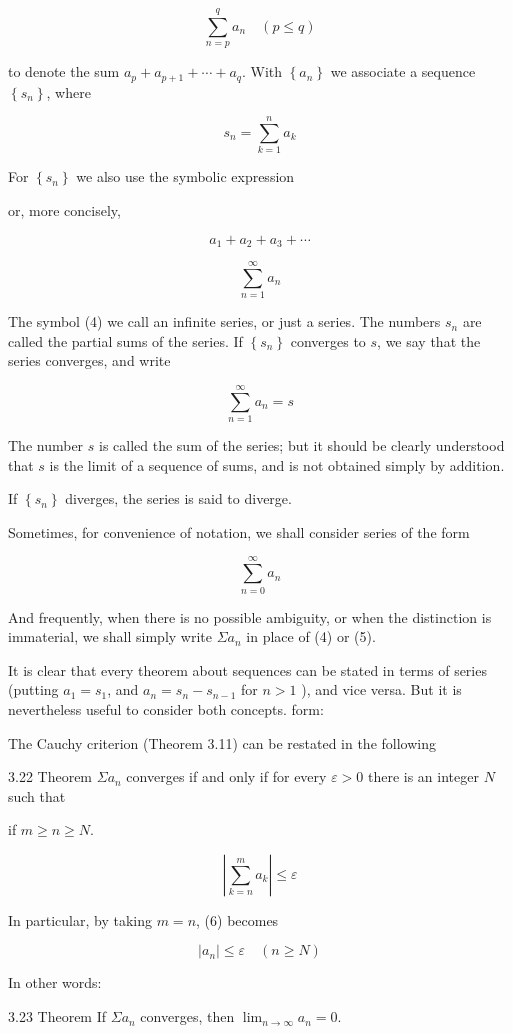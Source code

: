 \documentclass[10pt]{article}
\begin{document}
$$
\sum_{n=p}^{q} a_{n} \quad(p \leq q)
$$

to denote the sum $a_{p}+a_{p+1}+\cdots+a_{q}$. With $\left\{a_{n}\right\}$ we associate a sequence $\left\{s_{n}\right\}$, where

$$
s_{n}=\sum_{k=1}^{n} a_{k}
$$

For $\left\{s_{n}\right\}$ we also use the symbolic expression

or, more concisely,

$$
a_{1}+a_{2}+a_{3}+\cdots
$$

$$
\sum_{n=1}^{\infty} a_{n}
$$

The symbol (4) we call an infinite series, or just a series. The numbers $s_{n}$ are called the partial sums of the series. If $\left\{s_{n}\right\}$ converges to $s$, we say that the series converges, and write

$$
\sum_{n=1}^{\infty} a_{n}=s
$$

The number $s$ is called the sum of the series; but it should be clearly understood that $s$ is the limit of a sequence of sums, and is not obtained simply by addition.

If $\left\{s_{n}\right\}$ diverges, the series is said to diverge.

Sometimes, for convenience of notation, we shall consider series of the form

$$
\sum_{n=0}^{\infty} a_{n}
$$

And frequently, when there is no possible ambiguity, or when the distinction is immaterial, we shall simply write $\Sigma a_{n}$ in place of (4) or (5).

It is clear that every theorem about sequences can be stated in terms of series (putting $a_{1}=s_{1}$, and $a_{n}=s_{n}-s_{n-1}$ for $n>1$ ), and vice versa. But it is nevertheless useful to consider both concepts. form:

The Cauchy criterion (Theorem 3.11) can be restated in the following

3.22 Theorem $\Sigma a_{n}$ converges if and only if for every $\varepsilon>0$ there is an integer $N$ such that

if $m \geq n \geq N$.

$$
\left|\sum_{k=n}^{m} a_{k}\right| \leq \varepsilon
$$

In particular, by taking $m=n$, (6) becomes

$$
\left|a_{n}\right| \leq \varepsilon \quad(n \geq N)
$$

In other words:

3.23 Theorem If $\Sigma a_{n}$ converges, then $\lim _{n \rightarrow \infty} a_{n}=0$.
\end{document}
